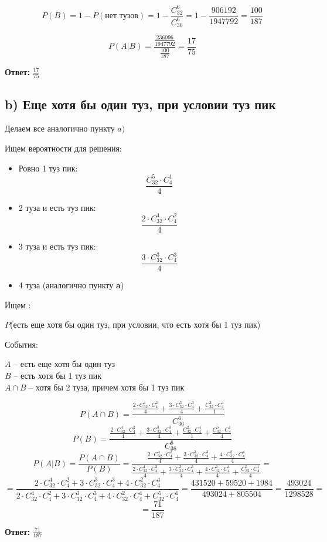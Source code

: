 \documentclass[a4paper,12pt]{article}
\begin{document}
\[
P(B) = 1 - P(\text{нет тузов}) =  1 - \frac{C^6_{32}}{C^6_{36}} = 1 - \frac{906192}{1947792} = \frac{100}{187}
\]

\[
P(A | B) = \frac{\frac{236096}{1947792}}{\frac{100}{187}} = \frac{17}{75}
\]
\begin{center}
\textbf{Ответ: }  $\frac{17}{75}$
\end{center}
\clearpage
\subsection*{b) Еще хотя бы один туз, при условии туз пик}
\begin{center}Делаем все аналогично пункту $a)$\end{center}

Ищем вероятности для решения:
\begin{itemize}
\item Ровно 1 туз пик:
\[
\frac{C^5_{32} \cdot C^1_4}{4}
\]
\item 2 туза и есть туз пик:
\[
\frac{2 \cdot C^4_{32} \cdot C^2_4}{4}
\]
\item 3 туза и есть туз пик:
\[
\frac{3 \cdot C^3_{32} \cdot C^3_4}{4}
\]
\item 4 туза (аналогично пункту \textbf{a})
\end{itemize}

Ищем :
\begin{center}
$P$(есть еще хотя бы один туз, при условии, что есть хотя бы 1 туз пик)
\end{center}
События:
\begin{center}
$A$ -- есть еще хотя бы один туз \\
$B$ -- есть хотя бы 1 туз пик \\
$A \cap B$ -- хотя бы 2 туза, причем хотя бы 1 туз пик
\end{center}
\[
P(A\cap B) = \frac{\frac{2 \cdot C^4_{32} \cdot C^2_4 }{4} +\frac{3 \cdot C^3_{32} \cdot C^3_4}{4} + \frac{C^2_{32} \cdot C^4_4}{1} }{C^6_{36}}
\]
\[
P(B) = \frac{\frac{2 \cdot C^4_{32} \cdot C^2_4 }{4} +\frac{3 \cdot C^3_{32} \cdot C^3_4}{4} + \frac{C^2_{32} \cdot C^4_4}{1} + \frac{C^5_{32} \cdot C^1_4}{4}}{C^6_{36}} 
\]
\[
P(A|B) = \frac{P(A \cap B)}{P(B)} = \frac{\frac{2 \cdot C^4_{32} \cdot C^2_4 }{4} +\frac{3 \cdot C^3_{32} \cdot C^3_4}{4} + \frac{4 \cdot C^2_{32} \cdot C^4_4}{4}}{\frac{2 \cdot C^4_{32} \cdot C^2_4 }{4} +\frac{3 \cdot C^3_{32} \cdot C^3_4}{4} + \frac{4 \cdot C^2_{32} \cdot C^4_4}{4} + \frac{C^5_{32} \cdot C^1_4}{4}} = 
\]
\[
=
\frac{2\cdot C^4_{32} \cdot C^2_4 + 3 \cdot C^3_{32} \cdot C^3_4 + 4 \cdot C^2_{32} \cdot C^4_4}{2\cdot C^4_{32} \cdot C^2_4 + 3 \cdot C^3_{32} \cdot C^3_4 + 4 \cdot C^2_{32} \cdot C^4_4 + C^5_{32} \cdot C^1_4} = \frac{431520 + 59520 + 1984}{493024 +805504 } = \frac{493024}{1298528} =
\]
\[
= \frac{71}{187}
\]
\begin{center}
\textbf{Ответ: } $\frac{71}{187}$
\end{center}
\clearpage
\end{document}
